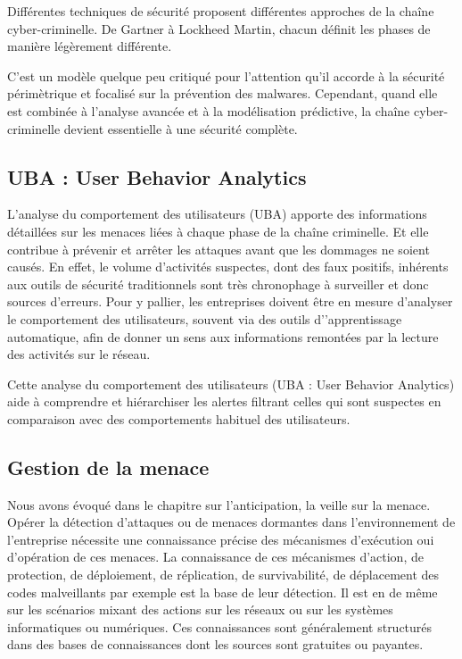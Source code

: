 Différentes techniques de sécurité proposent différentes approches de la chaîne cyber-criminelle. De Gartner à Lockheed Martin, chacun définit les phases de manière légèrement différente.

C’est un modèle quelque peu critiqué pour l’attention qu’il accorde à la sécurité  périmètrique et focalisé sur la prévention des malwares. Cependant, quand elle est combinée à l’analyse avancée et à la modélisation prédictive, la chaîne cyber-criminelle devient essentielle à une sécurité complète.

\subsection{UBA : User Behavior Analytics}


L’analyse du comportement des utilisateurs (UBA) apporte des informations détaillées sur les menaces liées à chaque phase de la chaîne criminelle. Et elle contribue à prévenir et arrêter les attaques avant que les dommages ne soient causés. En effet, le volume d’activités suspectes, dont des faux positifs, inhérents aux outils de sécurité traditionnels sont très chronophage à surveiller et donc sources d’erreurs.
Pour y pallier, les entreprises doivent être en mesure d’analyser le comportement des utilisateurs, souvent via des outils d'’apprentissage automatique, afin de donner un sens aux informations remontées par la lecture des activités sur le réseau.

Cette analyse du comportement des utilisateurs (UBA : User Behavior Analytics) aide à  comprendre et hiérarchiser les alertes filtrant celles qui sont suspectes en comparaison avec des comportements habituel des utilisateurs.

\subsection{Gestion de la menace}

Nous avons évoqué dans le chapitre sur l'anticipation, la veille sur la menace. Opérer la détection d'attaques ou de menaces dormantes dans l'environnement de l'entreprise nécessite une connaissance précise des mécanismes d'exécution oui d'opération de ces menaces.
La connaissance de ces mécanismes  d'action, de protection, de déploiement, de réplication, de survivabilité, de déplacement des codes malveillants par exemple est la base de leur détection. Il est en de même sur les scénarios mixant des actions sur les réseaux ou sur les systèmes informatiques ou numériques.
Ces connaissances sont généralement structurés dans des bases de connaissances dont les sources sont gratuites ou payantes.

